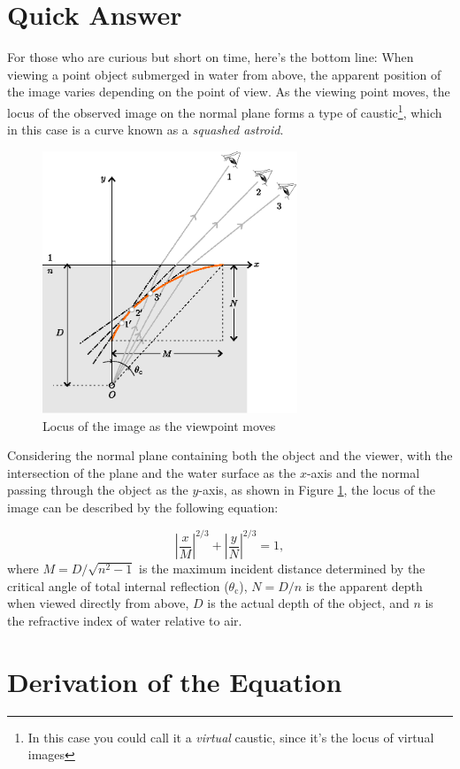 \documentclass[twocolumn]{article}
\begin{document}
\section{Quick Answer}

For those who are curious but short on time, here's the bottom line: When viewing a point object submerged in water from above, the apparent position of the image varies depending on the point of view. As the viewing point moves, the locus of the observed image on the normal plane forms a type of caustic\footnote{In this case you could call it a \emph{virtual} caustic, since it's the locus of virtual images}, which in this case is a curve known as a \emph{squashed astroid}.

\begin{figure}
	\centering
	\includegraphics[width=3in]{figs/g409.eps}
	\caption{Locus of the image as the viewpoint moves}
	\label{fig:caustic}
\end{figure}

Considering the normal plane containing both the object and the viewer, with the intersection of the plane and the water surface as the $x$-axis and the normal passing through the object as the $y$-axis, as shown in Figure \ref{fig:caustic}, the locus of the image can be described by the following equation:

$$ \left| \dfrac{x}{M} \right| ^ {2/3} + \left| \dfrac{y}{N} \right| ^ {2/3} = 1,$$
where $M = D/\sqrt{n^2 - 1}$ is the maximum incident distance determined by the critical angle of total internal reflection ($\theta_{\mathrm{c}}$), $N = D/n$ is the apparent depth when viewed directly from above, $D$ is the actual depth of the object, and $n$ is the refractive index of water relative to air.

\section{Derivation of the Equation}
\end{document}
